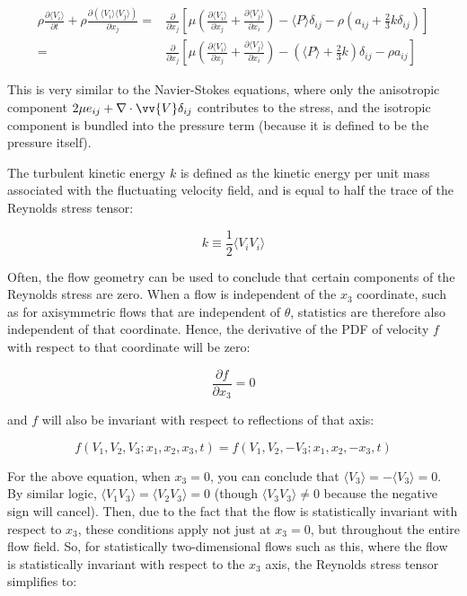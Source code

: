 \documentclass[10pt]{article}
\newcommand{\beq}{\begin{equation}}
\newcommand{\eeq}{\end{equation}}
\newcommand{\beqa}{\begin{equation}\begin{aligned}}
\newcommand{\eeqa}{\end{aligned}\end{equation}}
\newcommand{\la}{\langle}
\newcommand{\ra}{\rangle}
\newcounter{subsubsubsection}[subsubsection]
\begin{document}
\begin{flushleft}
\beqa
\rho\frac{\partial \la V_i\ra}{\partial t}+\rho\frac{\partial(\la V_i\ra\la V_j\ra)}{\partial x_j}=&\frac{\partial}{\partial x_j}\left\lbrack\mu\left(\frac{\partial\la V_i\ra}{\partial x_j}+\frac{\partial\la V_j\ra}{\partial x_i}\right)-\la P\ra\delta_{ij}-\rho \left(a_{ij}+\frac{2}{3}k\delta_{ij}\right)\right\rbrack\\
=&\frac{\partial}{\partial x_j}\left\lbrack\mu\left(\frac{\partial\la V_i\ra}{\partial x_j}+\frac{\partial\la V_j\ra}{\partial x_i}\right)-\left(\la P\ra+\frac{2}{3}k\right)\delta_{ij}-\rho a_{ij}\right\rbrack
\eeqa

This is very similar to the Navier-Stokes equations, where only the anisotropic component \(2\mu e_{ij}+\nabla\cdot\vv{V}\delta_{ij}\) contributes to the stress, and the isotropic component is bundled into the pressure term (because it is defined to be the pressure itself). 

The turbulent kinetic energy \(k\) is defined as the kinetic energy per unit mass associated with the fluctuating velocity field, and is equal to half the trace of the Reynolds stress tensor:

\beq
\label{eq:turbenergy}
k\equiv\frac{1}{2}\la V_iV_i\ra
\eeq






Often, the flow geometry can be used to conclude that certain components of the Reynolds stress are zero. When a flow is independent of the \(x_3\) coordinate, such as for axisymmetric flows that are independent of \(\theta\), statistics are therefore also independent of that coordinate. Hence, the derivative of the PDF of velocity \(f\) with respect to that coordinate will be zero:

\beq
\frac{\partial f}{\partial x_3}=0
\eeq

and \(f\) will also be invariant with respect to reflections of that axis:

\beq
f(V_1,V_2,V_3; x_1,x_2,x_3,t)=f(V_1,V_2,-V_3;x_1,x_2,-x_3,t)
\eeq

For the above equation, when \(x_3=0\), you can conclude that \(\la V_3\ra=-\la V_3\ra=0\). By similar logic, \(\la V_1V_3\ra=\la V_2V_3\ra=0\) (though \(\la V_3V_3\ra\neq0\) because the negative sign will cancel). Then, due to the fact that the flow is statistically invariant with respect to \(x_3\), these conditions apply not just at \(x_3=0\), but throughout the entire flow field. So, for statistically two-dimensional flows such as this, where the flow is statistically invariant with respect to the \(x_3\) axis, the Reynolds stress tensor simplifies to:


\end{flushleft}
\end{document}

